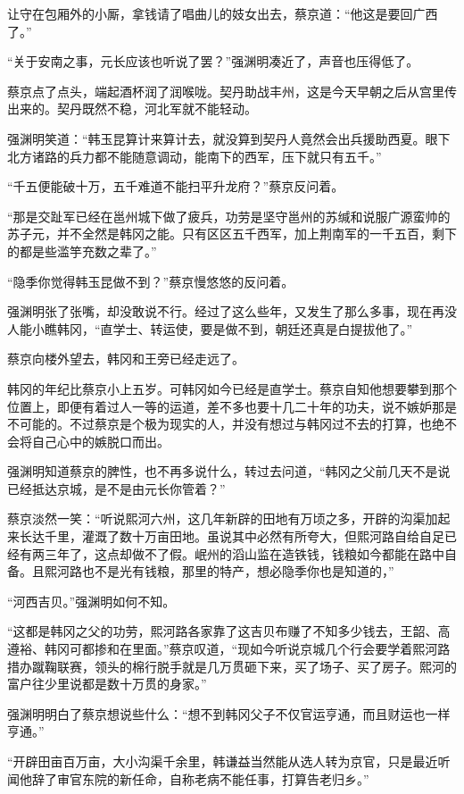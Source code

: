 让守在包厢外的小厮，拿钱请了唱曲儿的妓女出去，蔡京道：“他这是要回广西了。”

“关于安南之事，元长应该也听说了罢？”强渊明凑近了，声音也压得低了。

蔡京点了点头，端起酒杯润了润喉咙。契丹助战丰州，这是今天早朝之后从宫里传出来的。契丹既然不稳，河北军就不能轻动。

强渊明笑道：“韩玉昆算计来算计去，就没算到契丹人竟然会出兵援助西夏。眼下北方诸路的兵力都不能随意调动，能南下的西军，压下就只有五千。”

“千五便能破十万，五千难道不能扫平升龙府？”蔡京反问着。

“那是交趾军已经在邕州城下做了疲兵，功劳是坚守邕州的苏缄和说服广源蛮帅的苏子元，并不全然是韩冈之能。只有区区五千西军，加上荆南军的一千五百，剩下的都是些滥竽充数之辈了。”

“隐季你觉得韩玉昆做不到？”蔡京慢悠悠的反问着。

强渊明张了张嘴，却没敢说不行。经过了这么些年，又发生了那么多事，现在再没人能小瞧韩冈，“直学士、转运使，要是做不到，朝廷还真是白提拔他了。”

蔡京向楼外望去，韩冈和王旁已经走远了。

韩冈的年纪比蔡京小上五岁。可韩冈如今已经是直学士。蔡京自知他想要攀到那个位置上，即便有着过人一等的运道，差不多也要十几二十年的功夫，说不嫉妒那是不可能的。不过蔡京是个极为现实的人，并没有想过与韩冈过不去的打算，也绝不会将自己心中的嫉脱口而出。

强渊明知道蔡京的脾性，也不再多说什么，转过去问道，“韩冈之父前几天不是说已经抵达京城，是不是由元长你管着？”

蔡京淡然一笑：“听说熙河六州，这几年新辟的田地有万顷之多，开辟的沟渠加起来长达千里，灌溉了数十万亩田地。虽说其中必然有所夸大，但熙河路自给自足已经有两三年了，这点却做不了假。岷州的滔山监在造铁钱，钱粮如今都能在路中自备。且熙河路也不是光有钱粮，那里的特产，想必隐季你也是知道的，”

“河西吉贝。”强渊明如何不知。

“这都是韩冈之父的功劳，熙河路各家靠了这吉贝布赚了不知多少钱去，王韶、高遵裕、韩冈可都掺和在里面。”蔡京叹道，“现如今听说京城几个行会要学着熙河路措办蹴鞠联赛，领头的棉行脱手就是几万贯砸下来，买了场子、买了房子。熙河的富户往少里说都是数十万贯的身家。”

强渊明明白了蔡京想说些什么：“想不到韩冈父子不仅官运亨通，而且财运也一样亨通。”

“开辟田亩百万亩，大小沟渠千余里，韩谦益当然能从选人转为京官，只是最近听闻他辞了审官东院的新任命，自称老病不能任事，打算告老归乡。”

